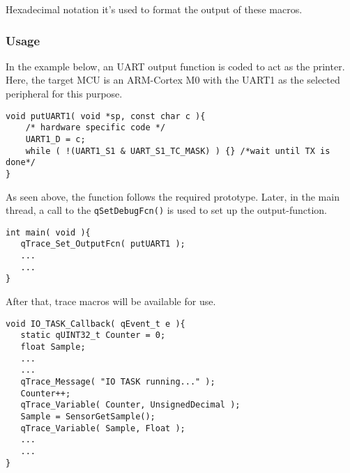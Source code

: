 Hexadecimal notation it's used to format the output of these macros.

\subsubsection{Usage}

In the example below, an UART output function is coded to act as the printer. Here, the target MCU is an ARM-Cortex M0 with the UART1 as the selected peripheral for this purpose.
\medskip

\begin{lstlisting}[style=CStyle]
void putUART1( void *sp, const char c ){
    /* hardware specific code */
    UART1_D = c;
    while ( !(UART1_S1 & UART_S1_TC_MASK) ) {} /*wait until TX is done*/ 
}
\end{lstlisting}  

As seen above, the function follows the required prototype. Later, in the main thread, a call to the \lstinline{qSetDebugFcn()} is used to set up the output-function.

\begin{lstlisting}[style=CStyle]
int main( void ){
   qTrace_Set_OutputFcn( putUART1 );
   ... 
   ...
}
\end{lstlisting}  

After that, trace macros will be available for use.

\begin{lstlisting}[style=CStyle]
void IO_TASK_Callback( qEvent_t e ){
   static qUINT32_t Counter = 0;
   float Sample;
   ...
   ... 
   qTrace_Message( "IO TASK running..." );
   Counter++;
   qTrace_Variable( Counter, UnsignedDecimal );
   Sample = SensorGetSample();
   qTrace_Variable( Sample, Float );
   ...
   ...
}
\end{lstlisting}